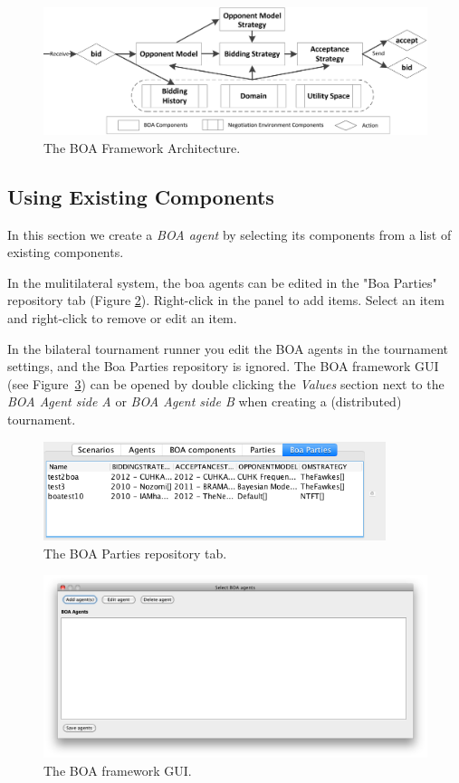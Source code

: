 \documentclass[]{article}
\begin{document}
\begin{figure}[t] 
	\center
	\includegraphics[width=15.0cm]{media/BOAflow.png}
	\caption{The BOA Framework Architecture.}
	\label{fig:flowchart}
\end{figure}
\pagebreak
\subsection{Using Existing Components}

In this section we create a \textit{BOA agent} by selecting its components from a list of existing components. 

In the mulitilateral system, the boa agents can be edited in the "Boa Parties" repository tab (Figure \ref{fig:boaparties}). Right-click in the panel to add items. Select an item and right-click to remove or edit an item. 

In the bilateral tournament runner you edit the BOA agents in the tournament settings, and the Boa Parties repository is ignored. The BOA framework GUI (see Figure~\ref{fig:decoupledGUI}) can be opened by double clicking the \textit{Values} section next to the \textit{BOA Agent side A} or \textit{BOA Agent side B} when creating a (distributed) tournament.


\begin{figure}[t] 
	\center
	\includegraphics[width=10.0cm]{media/boacomponants.png}
	\caption{The BOA Parties repository tab.}
	\label{fig:boaparties}
\end{figure}


\begin{figure}[h!]
	\center
	\includegraphics[width=15cm]{media/BOAgui.png}
	\caption{The BOA framework GUI.}
	\label{fig:decoupledGUI}
\end{figure}
\end{document}
